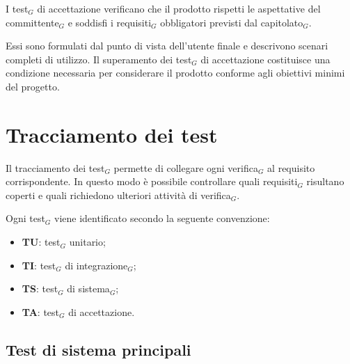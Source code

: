 \documentclass[a4paper, 10pt, colorlinks=true, linkcolor=black, urlcolor=blue, citecolor=blue, hidelinks]{article}
\begin{document}
I test$_G$ di accettazione verificano che il prodotto rispetti le aspettative del committente$_G$ e soddisfi i requisiti$_G$ obbligatori previsti dal capitolato$_G$.

Essi sono formulati dal punto di vista dell'utente finale e descrivono scenari completi di utilizzo. Il superamento dei test$_G$ di accettazione costituisce una condizione necessaria per considerare il prodotto conforme agli obiettivi minimi del progetto.

\section{Tracciamento dei test}

Il tracciamento dei test$_G$ permette di collegare ogni verifica$_G$ al requisito corrispondente. In questo modo è possibile controllare quali requisiti$_G$ risultano coperti e quali richiedono ulteriori attività di verifica$_G$.

Ogni test$_G$ viene identificato secondo la seguente convenzione:

\begin{itemize}
    \item \textbf{TU}: test$_G$ unitario;
    \item \textbf{TI}: test$_G$ di integrazione$_G$;
    \item \textbf{TS}: test$_G$ di sistema$_G$;
    \item \textbf{TA}: test$_G$ di accettazione.
\end{itemize}

\subsection{Test di sistema principali}
\end{document}
